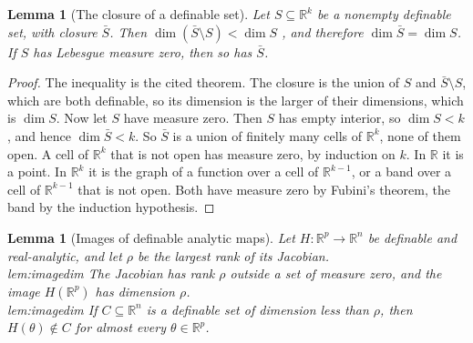 \documentclass[10pt]{article}
\newtheorem{lemma}[theorem]{Lemma}
\theoremstyle{definition}
\theoremstyle{remark}
\newcommand{\R}{\mathbb{R}}
\newcommand{\ptlabel}[1]{\phantomsection\label{#1}}
\newcommand{\stpart}[3]{\ifx\relax#1\relax\else\ptlabel{#1:#2}\fi{\upshape\bfseries\boldmath(#2)\ifx\relax#3\relax\else\ #3.\fi}}
\begin{document}
\begin{lemma}[The closure of a definable set]\label{lem:closure}
Let $S \subseteq \R^k$ be a nonempty definable set, with closure $\bar S$. Then $\dim(\bar S \setminus S) < \dim S$ \citep[Chapter~4, Theorem~(1.8)]{vandendries1998tame}, and therefore $\dim\bar S = \dim S$. If $S$ has Lebesgue measure zero, then so has $\bar S$.
\end{lemma}

\begin{proof}
The inequality is the cited theorem. The closure is the union of $S$ and $\bar S \setminus S$, which are both definable, so its dimension is the larger of their dimensions, which is $\dim S$. Now let $S$ have measure zero. Then $S$ has empty interior, so $\dim S < k$, and hence $\dim\bar S < k$. So $\bar S$ is a union of finitely many cells of $\R^k$, none of them open. A cell of $\R^k$ that is not open has measure zero, by induction on $k$. In $\R$ it is a point. In $\R^k$ it is the graph of a function over a cell of $\R^{k-1}$, or a band over a cell of $\R^{k-1}$ that is not open. Both have measure zero by Fubini's theorem, the band by the induction hypothesis.
\end{proof}

\begin{lemma}[Images of definable analytic maps]\label{lem:imagedim}
Let $H : \R^p \to \R^n$ be definable and real-analytic, and let $\rho$ be the largest rank of its Jacobian.\\
\stpart{lem:imagedim}{i}{} The Jacobian has rank $\rho$ outside a set of measure zero, and the image $H(\R^p)$ has dimension $\rho$.\\
\stpart{lem:imagedim}{ii}{} If $C \subseteq \R^n$ is a definable set of dimension less than $\rho$, then $H(\theta) \notin C$ for almost every $\theta \in \R^p$.
\end{lemma}
\end{document}
